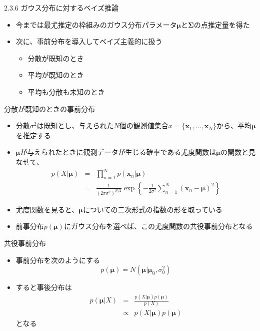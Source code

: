 \begin{frame}{2.3.6 ガウス分布に対するベイズ推論}
 \begin{itemize}
  \item 今までは最尤推定の枠組みのガウス分布パラメータ$\bm{\mu}$と$\bm{\Sigma}$の点推定量を得た
  \item 次に、事前分布を導入してベイズ主義的に扱う
        \begin{itemize}
         \item 分散が既知のとき
         \item 平均が既知のとき
         \item 平均も分散も未知のとき
        \end{itemize}
 \end{itemize}
\end{frame}

\begin{frame}{分散が既知のときの事前分布}
 \begin{itemize}
  \item \alert{分散$\sigma^2$は既知}とし、与えられた$N$個の観測値集合$x=\{\bm{x}_1,...,\bm{x}_N\}$から、平均$\bm{\mu}$を推定する
  \item $\bm{\mu}$が与えられたときに観測データが生じる確率である尤度関数は$\bm{\mu}$の関数と見なせて、
        \begin{eqnarray*}
         p(X|\bm{\mu}) &= &\prod_{n=1}^{N}p(\bm{x}_n|\bm{\mu}) \\
         &=& \frac{1}{(2\pi\sigma^2)^{N/2}}\exp\left\{-\frac{1}{2\sigma^2}\sum_{n=1}^{N}(\bm{x}_n-\bm{\mu})^2\right\}
        \end{eqnarray*}
  \item 尤度関数を見ると、$\bm{\mu}$についての二次形式の指数の形を取っている
  \item 前事分布$p(\bm{\mu})$にガウス分布を選べば、この尤度関数の共役事前分布となる
 \end{itemize}
\end{frame}

\begin{frame}{共役事前分布}
 \begin{itemize}

  \item 事前分布を次のようにする
        \begin{equation}
         p(\bm{\mu}) = N(\bm{\mu}|\bm{\mu}_0,\sigma_0^2)
        \end{equation}
  \item すると事後分布は
        \begin{eqnarray}
         p(\bm{\mu}|X)&=&\frac{p(X|\bm{\mu})p(\bm{\mu})}{p(X)} \nonumber \\
         &\propto &p(X|\bm{\mu})p(\bm{\mu})
        \end{eqnarray}
        となる
 \end{itemize}
\end{frame}

